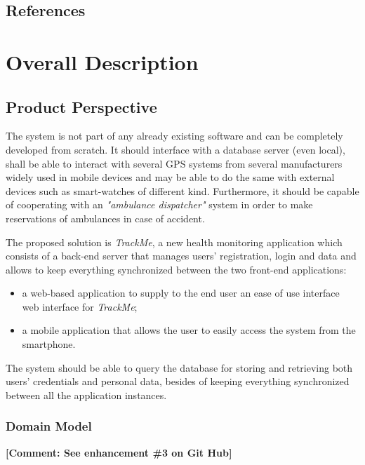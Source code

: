 \documentclass[a4paper]{article}
\newcommand{\comment}[1]{\textbf{[Comment: #1]}}
\begin{document}
    \subsection{References}
        \printbibliography[heading=none]
\newpage
\section{Overall Description}
    \subsection{Product Perspective}
    
    The system is not part of any already existing software and can be completely developed from scratch. It should interface with a database server (even local), shall be able to interact with several GPS systems from several manufacturers widely used in mobile devices and may be able to do the same with external devices such as smart-watches of different kind. Furthermore, it should be capable of cooperating with an \textit{"ambulance dispatcher"} system in order to make reservations of ambulances in case of accident.
    
    The proposed solution is \textit{TrackMe}, a new health monitoring application which consists of a back-end server that manages users' registration, login and data and allows to keep everything synchronized between the two front-end applications:
        \begin{itemize}
            \item a web-based application to supply to the end user an ease of use interface web interface for \textit{TrackMe};
            \item a mobile application that allows the user to easily access the system from the smartphone.
        \end{itemize}
    
    The system should be able to query the database for storing and retrieving both users' credentials and personal data, besides of keeping everything synchronized between all the application instances.
    
    \subsubsection{Domain Model}
    \comment{See enhancement \#3 on Git Hub}
    
\end{document}

